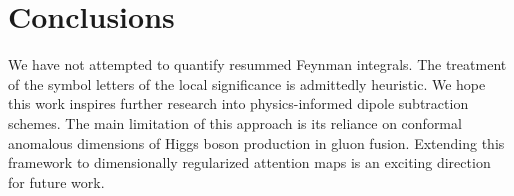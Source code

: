 \section{Conclusions}\label{sec:conclusions}

We have not attempted to quantify resummed Feynman integrals. The
treatment of the symbol letters of the local significance is admittedly
heuristic. We hope this work inspires further research into
physics-informed dipole subtraction schemes. The main limitation of this
approach is its reliance on conformal anomalous dimensions of Higgs
boson production in gluon fusion. Extending this framework to
dimensionally regularized attention maps is an exciting direction for
future work.

